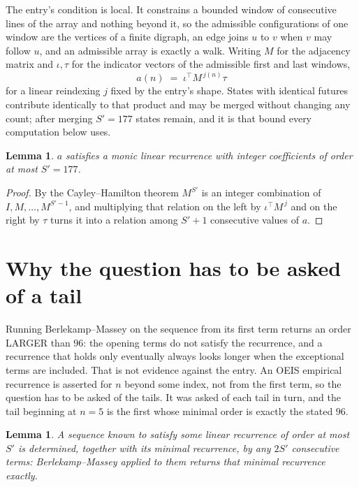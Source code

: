 \documentclass[11pt,a4paper]{article}
\theoremstyle{plain}
\newtheorem{lemma}[theorem]{Lemma}
\theoremstyle{definition}
\begin{document}
The entry's condition is local. It constrains a bounded window of consecutive lines of the
array and nothing beyond it, so the admissible configurations of one window are the vertices of
a finite digraph, an edge joins $u$ to $v$ when $v$ may follow $u$, and an admissible array is
exactly a walk. Writing $M$ for the adjacency matrix and $\iota,\tau$ for the indicator vectors
of the admissible first and last windows,
\[
a(n)\;=\;\iota^{\!\top}M^{\,j(n)}\tau
\]
for a linear reindexing $j$ fixed by the entry's shape. States with identical futures
contribute identically to that product and may be merged without changing any count; after
merging $S'=177$ states remain, and it is that bound every computation below uses.

\begin{lemma}\label{lem:cf}
$a$ satisfies a monic linear recurrence with integer coefficients of order at most $S'=177$.
\end{lemma}

\begin{proof}
By the Cayley--Hamilton theorem $M^{S'}$ is an integer combination of $I,M,\dots,M^{S'-1}$,
and multiplying that relation on the left by $\iota^{\!\top}M^{\,j}$ and on the right by
$\tau$ turns it into a relation among $S'+1$ consecutive values of $a$.
\end{proof}

\section{Why the question has to be asked of a tail}

Running Berlekamp--Massey on the sequence from its first term returns an order LARGER than $96$: the opening terms do not satisfy the recurrence, and a recurrence that holds only eventually always looks longer when the exceptional terms are included. That is not evidence against the entry. An OEIS empirical recurrence is asserted for $n$ beyond some index, not from the first term, so the question has to be asked of the tails. It was asked of each tail in turn, and the tail beginning at $n=5$ is the first whose minimal order is exactly the stated $96$.

\begin{lemma}\label{lem:bm}
A sequence known to satisfy some linear recurrence of order at most $S'$ is determined,
together with its minimal recurrence, by any $2S'$ consecutive terms: Berlekamp--Massey applied
to them returns that minimal recurrence exactly.
\end{lemma}
\end{document}
